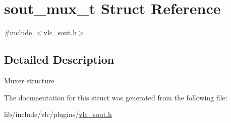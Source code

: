 \hypertarget{structsout__mux__t}{}\section{sout\+\_\+mux\+\_\+t Struct Reference}
\label{structsout__mux__t}


{\ttfamily \#include $<$vlc\+\_\+sout.\+h$>$}



\subsection{Detailed Description}
Muxer structure 

The documentation for this struct was generated from the following file\+:\begin{DoxyCompactItemize}
\item 
lib/include/vlc/plugins/\hyperlink{vlc__sout_8h}{vlc\+\_\+sout.\+h}\end{DoxyCompactItemize}
